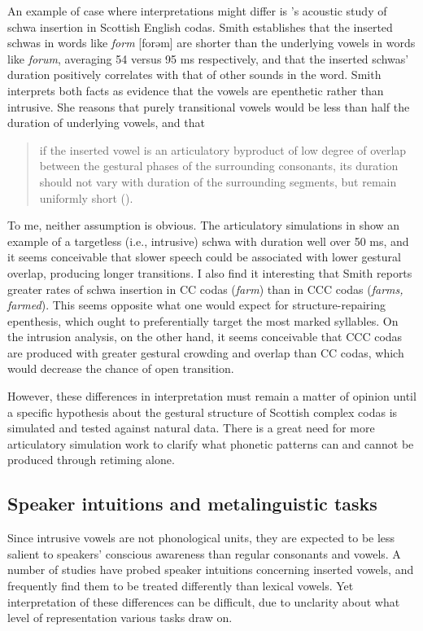 \documentclass[output=paper,colorlinks,citecolor=brown]{langscibook}
\begin{document}
An example of case where interpretations might differ is \citet{smith2019vowel}’s acoustic study of schwa insertion in Scottish English codas. Smith establishes that the inserted schwas in words like \textit{form} [forəm] are shorter than the underlying vowels in words like \textit{forum}, averaging 54 versus 95 ms respectively, and that the inserted schwas’ duration positively correlates with that of other sounds in the word. Smith interprets both facts as evidence that the vowels are epenthetic rather than intrusive. She reasons that purely transitional vowels would be less than half the duration of underlying vowels, and that 

\begin{quote}
   if the inserted vowel is an articulatory byproduct of low degree of overlap between the gestural phases of the surrounding consonants, its duration should not vary with duration of the surrounding segments, but remain uniformly short (\cite[133]{smith2019vowel}).
\end{quote}

To me, neither assumption is obvious. The articulatory simulations in \citet[55]{browman1992targetless} show an example of a targetless (i.e., intrusive) schwa with duration well over 50 ms, and it seems conceivable that slower speech could be associated with lower gestural overlap, producing longer transitions. I also find it interesting that Smith reports greater rates of schwa insertion in CC codas (\textit{farm}) than in CCC codas (\textit{farms, farmed}). This seems opposite what one would expect for structure-repairing epenthesis, which ought to preferentially target the most marked syllables. On the intrusion analysis, on the other hand, it seems conceivable that CCC codas are produced with greater gestural crowding and overlap than CC codas, which would decrease the chance of open transition. 

However, these differences in interpretation must remain a matter of opinion until a specific hypothesis about the gestural structure of Scottish complex codas is simulated and tested against natural data. There is a great need for more articulatory simulation work to clarify what phonetic patterns can and cannot be produced through retiming alone. 

\subsection{Speaker intuitions and metalinguistic tasks} \label{sec3_3}
Since intrusive vowels are not phonological units, they are expected to be less salient to speakers’ conscious awareness than regular consonants and vowels. A number of studies have probed speaker intuitions concerning inserted vowels, and frequently find them to be treated differently than lexical vowels. Yet interpretation of these differences can be difficult, due to unclarity about what level of representation various tasks draw on. 
\end{document}
